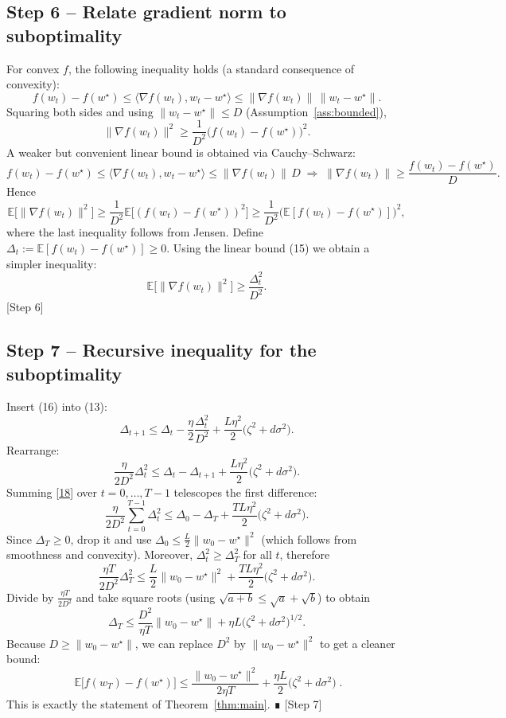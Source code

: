 \documentclass{article}
\newcommand{\E}{\mathbb{E}}
\begin{document}
\subsection*{Step 6 – Relate gradient norm to suboptimality}
For convex $f$, the following inequality holds (a standard consequence of
convexity):
\[
f(w_t)-f(w^\star) \le \langle\nabla f(w_t),w_t-w^\star\rangle
                 \le \| \nabla f(w_t)\|\,\|w_t-w^\star\| .      \tag{14}
\] 
Squaring both sides and using $\|w_t-w^\star\|\le D$ (Assumption~\ref{ass:bounded}),
\[
\|\nabla f(w_t)\|^2 \ge \frac{1}{D^{2}}\bigl(f(w_t)-f(w^\star)\bigr)^2 .
\] 
A weaker but convenient linear bound is obtained via Cauchy–Schwarz:
\[
f(w_t)-f(w^\star) \le \langle\nabla f(w_t),w_t-w^\star\rangle
                 \le \|\nabla f(w_t)\|\,D
\;\Longrightarrow\;
\|\nabla f(w_t)\| \ge \frac{f(w_t)-f(w^\star)}{D}.                \tag{15}
\] 
Hence
\[
\E\!\bigl[\|\nabla f(w_t)\|^2\bigr]
   \ge \frac{1}{D^{2}}\E\!\bigl[(f(w_t)-f(w^\star))^{2}\bigr]
   \ge \frac{1}{D^{2}}\bigl(\E[f(w_t)-f(w^\star)]\bigr)^{2},
\] 
where the last inequality follows from Jensen.
Define $\Delta_t:=\E[f(w_t)-f(w^\star)]\ge0$.
Using the linear bound (15) we obtain a simpler inequality:
\[
\E\!\bigl[\|\nabla f(w_t)\|^2\bigr]\ge\frac{\Delta_t^{2}}{D^{2}}. \tag{16}
\] 
[Step 6]

\subsection*{Step 7 – Recursive inequality for the suboptimality}
Insert (16) into (13):
\[
\Delta_{t+1}
\le \Delta_t -\frac{\eta}{2}\frac{\Delta_t^{2}}{D^{2}}
   +\frac{L\eta^{2}}{2}\bigl(\zeta^{2}+d\sigma^{2}\bigr).           \tag{17}
\] 
Rearrange:
\[
\frac{\eta}{2D^{2}}\Delta_t^{2}
\le \Delta_t-\Delta_{t+1}
   +\frac{L\eta^{2}}{2}\bigl(\zeta^{2}+d\sigma^{2}\bigr).           \tag{18}
\] 
Summing \eqref{18} over $t=0,\dots,T-1$ telescopes the first difference:
\[
\frac{\eta}{2D^{2}}\sum_{t=0}^{T-1}\Delta_t^{2}
\le \Delta_0-\Delta_T
   +\frac{TL\eta^{2}}{2}\bigl(\zeta^{2}+d\sigma^{2}\bigr).         \tag{19}
\] 
Since $\Delta_T\ge0$, drop it and use $\Delta_0\le \frac{L}{2}\|w_0-w^\star\|^{2}$
(which follows from smoothness and convexity).  Moreover,
$\Delta_t^{2}\ge \Delta_T^{2}$ for all $t$, therefore
\[
\frac{\eta T}{2D^{2}}\Delta_T^{2}
\le \frac{L}{2}\|w_0-w^\star\|^{2}
   +\frac{TL\eta^{2}}{2}\bigl(\zeta^{2}+d\sigma^{2}\bigr).          \tag{20}
\] 
Divide by $\frac{\eta T}{2D^{2}}$ and take square roots (using
$\sqrt{a+b}\le\sqrt{a}+\sqrt{b}$) to obtain
\[
\Delta_T
\le \frac{D^{2}}{\eta T}\|w_0-w^\star\|
   +\eta L\bigl(\zeta^{2}+d\sigma^{2}\bigr)^{1/2}.
\] 
Because $D\ge\|w_0-w^\star\|$, we can replace $D^{2}$ by $\|w_0-w^\star\|^{2}$
to get a cleaner bound:
\[
\boxed{\;
\E\!\bigl[f(w_T)-f(w^\star)\bigr]
\le
\frac{\|w_0-w^\star\|^{2}}{2\eta T}
+\frac{\eta L}{2}\bigl(\zeta^{2}+d\sigma^{2}\bigr)
\;}.                                                               \tag{21}
\] 
This is exactly the statement of Theorem~\ref{thm:main}.   ∎
[Step 7]
\end{document}
